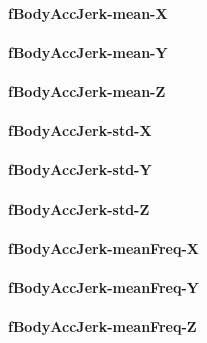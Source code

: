 \documentclass[
]{article}
\begin{document}
\hypertarget{fbodyaccjerk-mean-x}{%
\paragraph{fBodyAccJerk-mean-X}\label{fbodyaccjerk-mean-x}}

\hypertarget{fbodyaccjerk-mean-y}{%
\paragraph{fBodyAccJerk-mean-Y}\label{fbodyaccjerk-mean-y}}

\hypertarget{fbodyaccjerk-mean-z}{%
\paragraph{fBodyAccJerk-mean-Z}\label{fbodyaccjerk-mean-z}}

\hypertarget{fbodyaccjerk-std-x}{%
\paragraph{fBodyAccJerk-std-X}\label{fbodyaccjerk-std-x}}

\hypertarget{fbodyaccjerk-std-y}{%
\paragraph{fBodyAccJerk-std-Y}\label{fbodyaccjerk-std-y}}

\hypertarget{fbodyaccjerk-std-z}{%
\paragraph{fBodyAccJerk-std-Z}\label{fbodyaccjerk-std-z}}

\hypertarget{fbodyaccjerk-meanfreq-x}{%
\paragraph{fBodyAccJerk-meanFreq-X}\label{fbodyaccjerk-meanfreq-x}}

\hypertarget{fbodyaccjerk-meanfreq-y}{%
\paragraph{fBodyAccJerk-meanFreq-Y}\label{fbodyaccjerk-meanfreq-y}}

\hypertarget{fbodyaccjerk-meanfreq-z}{%
\paragraph{fBodyAccJerk-meanFreq-Z}\label{fbodyaccjerk-meanfreq-z}}
\end{document}
